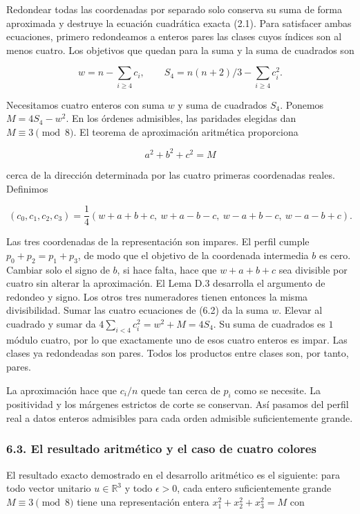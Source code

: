 \documentclass[spanish,11pt,a4paper]{article}
\begin{document}
Redondear todas las coordenadas por separado solo conserva su suma de forma aproximada y destruye la ecuación cuadrática exacta (2.1). Para satisfacer ambas ecuaciones, primero redondeamos a enteros pares las clases cuyos índices son al menos cuatro. Los objetivos que quedan para la suma y la suma de cuadrados son

\[w=n-\sum_{i\ge4}c_i,\qquad S_4=n(n+2)/3-\sum_{i\ge4}c_i^2.\]

Necesitamos cuatro enteros con suma \(w\) y suma de cuadrados \(S_4\). Ponemos \(M=4S_4-w^2\). En los órdenes admisibles, las paridades elegidas dan \(M\equiv3\pmod8\). El teorema de aproximación aritmética proporciona

\[a^2+b^2+c^2=M\]

cerca de la dirección determinada por las cuatro primeras coordenadas reales. Definimos

\[(c_0,c_1,c_2,c_3)=\frac14
(w+a+b+c,\ w+a-b-c,\ w-a+b-c,\ w-a-b+c).
\tag{6.2}\]

Las tres coordenadas de la representación son impares. El perfil cumple \(p_0+p_2=p_1+p_3\), de modo que el objetivo de la coordenada intermedia \(b\) es cero. Cambiar solo el signo de \(b\), si hace falta, hace que \(w+a+b+c\) sea divisible por cuatro sin alterar la aproximación. El Lema D.3 desarrolla el argumento de redondeo y signo. Los otros tres numeradores tienen entonces la misma divisibilidad. Sumar las cuatro ecuaciones de (6.2) da la suma \(w\). Elevar al cuadrado y sumar da \(4\sum_{i<4}c_i^2=w^2+M=4S_4\). Su suma de cuadrados es \(1\) módulo cuatro, por lo que exactamente uno de esos cuatro enteros es impar. Las clases ya redondeadas son pares. Todos los productos entre clases son, por tanto, pares.

La aproximación hace que \(c_i/n\) quede tan cerca de \(p_i\) como se necesite. La positividad y los márgenes estrictos de corte se conservan. Así pasamos del perfil real a datos enteros admisibles para cada orden admisible suficientemente grande.

\subsubsection{6.3. El resultado aritmético y el caso de cuatro colores}\label{el-resultado-aritmuxe9tico-y-el-caso-de-cuatro-colores}

El resultado exacto demostrado en el desarrollo aritmético es el siguiente: para todo vector unitario \(u\in\mathbb R^3\) y todo \(\epsilon>0\), cada entero suficientemente grande \(M\equiv3\pmod8\) tiene una representación entera \(x_1^2+x_2^2+x_3^2=M\) con
\end{document}
